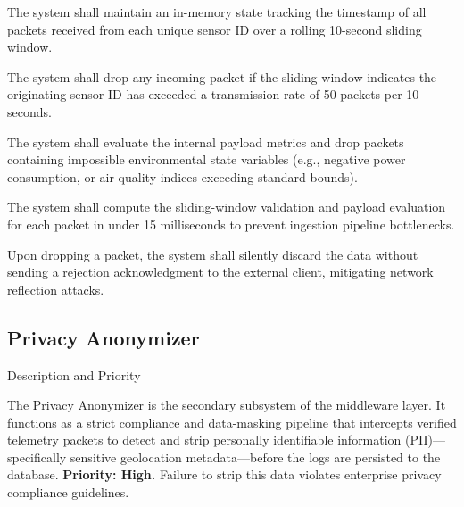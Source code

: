 \documentclass[12pt,letterpaper]{article}
\begin{document}
\vspace{0.08in}
\noindent\hspace*{0.94in} The system shall maintain an in-memory state tracking the timestamp of all packets received from each unique sensor ID over a rolling 10-second sliding window.\par
\vspace{0.04in}
\noindent\hspace*{0.94in} The system shall drop any incoming packet if the sliding window indicates the originating sensor ID has exceeded a transmission rate of 50 packets per 10 seconds.\par
\vspace{0.04in}
\noindent\hspace*{0.94in} The system shall evaluate the internal payload metrics and drop packets containing impossible environmental state variables (e.g., negative power consumption, or air quality indices exceeding standard bounds).\par
\vspace{0.04in}
\noindent\hspace*{0.94in} The system shall compute the sliding-window validation and payload evaluation for each packet in under 15 milliseconds to prevent ingestion pipeline bottlenecks.\par
\vspace{0.04in}
\noindent\hspace*{0.94in} Upon dropping a packet, the system shall silently discard the data without sending a rejection acknowledgment to the external client, mitigating network reflection attacks.\par
\subsection{Privacy Anonymizer}

\par\vspace{0.083in}\noindent\hspace*{0.44in}Description and Priority\par\vspace{0.083in}
\begin{list}{}{\setlength{\leftmargin}{0.94in}\setlength{\rightmargin}{0pt}}\item[]
The Privacy Anonymizer is the secondary subsystem of the middleware layer. It functions as a strict compliance and data-masking pipeline that intercepts verified telemetry packets to detect and strip personally identifiable information (PII)—specifically sensitive geolocation metadata—before the logs are persisted to the database. \textbf{Priority: High.} Failure to strip this data violates enterprise privacy compliance guidelines.
\end{list}
\end{document}
